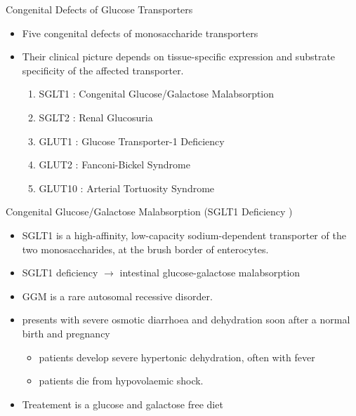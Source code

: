 \documentclass[presentation, smaller]{beamer}
\begin{document}
\begin{frame}[label={sec:org7bf2622}]{Congenital Defects of Glucose Transporters}
\begin{itemize}
\item Five congenital defects of monosaccharide transporters
\item Their clinical picture depends on tissue-specific expression and
substrate specificity of the affected transporter.

\begin{enumerate}
\item SGLT1 : Congenital Glucose/Galactose Malabsorption
\item SGLT2 : Renal Glucosuria
\item GLUT1 : Glucose Transporter-1 Deficiency
\item GLUT2 : Fanconi-Bickel Syndrome
\item GLUT10 : Arterial Tortuosity Syndrome
\end{enumerate}
\end{itemize}
\end{frame}

\begin{frame}[label={sec:orge76a2b0}]{Congenital Glucose/Galactose Malabsorption (SGLT1 Deficiency )}
\begin{itemize}
\item SGLT1 is a high-affinity, low-capacity sodium-dependent transporter
of the two monosaccharides, at the brush border of enterocytes.

\item SGLT1 deficiency \(\to\) intestinal glucose-galactose malabsorption
\item GGM is a rare autosomal recessive disorder.

\item presents with severe osmotic diarrhoea and dehydration soon after a
normal birth and pregnancy
\begin{itemize}
\item patients develop severe hypertonic dehydration, often with fever
\item patients die from hypovolaemic shock.
\end{itemize}

\item Treatement is a glucose and galactose free diet
\end{itemize}
\end{frame}
\end{document}
